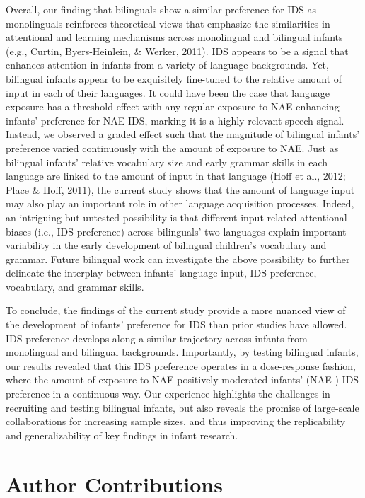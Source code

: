 \documentclass[
  english,
  ,man,floatsintext]{apa6}
\begin{document}
Overall, our finding that bilinguals show a similar preference for IDS as monolinguals reinforces theoretical views that emphasize the similarities in attentional and learning mechanisms across monolingual and bilingual infants (e.g., Curtin, Byers-Heinlein, \& Werker, 2011). IDS appears to be a signal that enhances attention in infants from a variety of language backgrounds. Yet, bilingual infants appear to be exquisitely fine-tuned to the relative amount of input in each of their languages. It could have been the case that language exposure has a threshold effect with any regular exposure to NAE enhancing infants' preference for NAE-IDS, marking it is a highly relevant speech signal. Instead, we observed a graded effect such that the magnitude of bilingual infants' preference varied continuously with the amount of exposure to NAE. Just as bilingual infants' relative vocabulary size and early grammar skills in each language are linked to the amount of input in that language (Hoff et al., 2012; Place \& Hoff, 2011), the current study shows that the amount of language input may also play an important role in other language acquisition processes. Indeed, an intriguing but untested possibility is that different input-related attentional biases (i.e., IDS preference) across bilinguals' two languages explain important variability in the early development of bilingual children's vocabulary and grammar. Future bilingual work can investigate the above possibility to further delineate the interplay between infants' language input, IDS preference, vocabulary, and grammar skills.

To conclude, the findings of the current study provide a more nuanced view of the development of infants' preference for IDS than prior studies have allowed. IDS preference develops along a similar trajectory across infants from monolingual and bilingual backgrounds. Importantly, by testing bilingual infants, our results revealed that this IDS preference operates in a dose-response fashion, where the amount of exposure to NAE positively moderated infants' (NAE-) IDS preference in a continuous way. Our experience highlights the challenges in recruiting and testing bilingual infants, but also reveals the promise of large-scale collaborations for increasing sample sizes, and thus improving the replicability and generalizability of key findings in infant research.

\hypertarget{author-contributions}{%
\section{Author Contributions}\label{author-contributions}}
\end{document}
